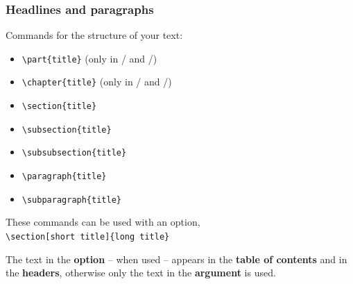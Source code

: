 \begin{frame}[fragile]
\frametitle{Headlines and paragraphs}

\noindent Commands for the structure of your text:

\begin{itemize}
	\item \lstinline|\part{title}|  \hfill (only in  / and /)
	
	\item \lstinline|\chapter{title}| \hfill (only in  / and /)
		
	\item \lstinline|\section{title}|
	
	\item \lstinline|\subsection{title}| 
	
	\item \lstinline|\subsubsection{title}| 
	
	\item \lstinline|\paragraph{title}|
	
	\item \lstinline|\subparagraph{title}|
\end{itemize}

\pause 

\bigskip

\noindent These commands can be used with an option, \fe\\

\lstinline|\section[short title]{long title}| 

\bigskip

The text in the \textbf{option} -- when used -- appears in the \textbf{table of contents} and in the \textbf{headers}, otherwise only the text in the \textbf{argument} is used.


\end{frame}



